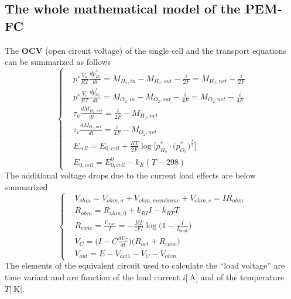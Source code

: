 \documentclass[12pt,a4paper]{scrartcl}
\begin{document}
\begin{onehalfspace}
\subsection{The whole mathematical model of the PEM-FC}
\begin{mybox}
The \textbf{OCV} (open circuit voltage) of the single cell and the transport equations can be summarized as follows
\begin{equation}
\left\lbrace \begin{aligned}
	&	p^\circ\frac{V_a}{RT}\frac{dp_{H_2}^*}{dt} = M_{H_2,in} - M_{H_2,out} - \frac{i}{2F} = M_{H_2,net} - \frac{i}{2F} \\[8pt]
	&	p^\circ\frac{V_c}{RT}\frac{dp_{O_2}^*}{dt} = M_{O_2,in} - M_{O_2,out} - \frac{i}{4F} = M_{O_2,net} - \frac{i}{4F} \\[8pt]
	&	\tau_{a}\frac{dM_{H_2,net}}{dt} = \frac{i}{2F} - M_{H_2,net} \\[8pt]
	&	\tau_{c}\frac{dM_{O_2,net}}{dt} = \frac{i}{4F} - M_{O_2,net} \\[8pt]
	&	E_{cell} = E_{0,cell} + \frac{RT}{2F}\log\Bigg[{p_{H_2}^*\cdot\Big(p_{O_2}^*\Big)^{\frac{1}{2}}}\Bigg] \\[8pt]
	&	E_{0,cell} = E_{0,cell}^0 - k_E(T-298)
\end{aligned}\right. 
\end{equation}
The additional voltage drops due to the current load effects are below summarized
\begin{equation}
\left\lbrace \begin{aligned}
		&	V_{ohm} = V_{ohm,a} + V_{ohm,membrane} + V_{ohm,c} = IR_{ohm} \\[8pt]
		&	R_{ohm} = R_{ohm,0} + k_{RI}I - k_{RT}T \\[8pt]
		&	R_{conc}=\frac{V_{conc}}{I}=-\frac{RT}{zFI}\log\Big(1-\frac{I}{I_{\text{limit}}}\Big) \\[8pt]
		&	V_{C}=\Big(I-C\frac{dV_C}{dt}\Big)\big(R_{act}+R_{conc}\big) \\[8pt]
		&	V_{out} = E - V_{act1} - V_C - V_{ohm}
	\end{aligned}\right. 
\end{equation}
The elements of the equivalent circuit used to calculate the “load voltage” are time variant and are function of the load current $i\Big[\SI{}{\ampere}\Big]$ and of the temperature $T\Big[\SI{}{\kelvin}\Big]$.
\end{mybox}


\end{onehalfspace}
\end{document}
